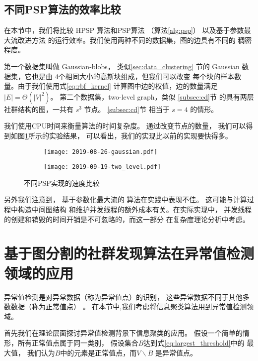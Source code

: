 \subsection{不同PSP算法的效率比较}
在本节中，我们将比较 HPSP 算法和PSP算法
（算法\ref{alg:psp}）
以及基于参数最大流改进方法\cite{kolmogorov}
的运行效率。我们使用两种不同的数据集，图的边具有不同的
稠密程度。

第一个数据集叫做 Gaussian-blobs，
类似\ref{sec:data_clustering}
节的 Gaussian 数据集，它也是由
4个相同大小的高斯块组成，但我们可以改变
每个块的样本数量。由于我们使用式\ref{eq:rbf_kernel}
计算图中边的权值，边的数量满足 $|E|=\Theta(|V|^2)$。
第二个数据集，two-level graph，类似 \ref{subsec:cd}节
的具有两层社群结构的图，一共有 $s^3$ 节点。
\ref{subsec:cd}节 相当于 $s=4$ 的情形。

我们使用CPU时间来衡量算法的时间复杂度。
通过改变节点的数量，
我们可以得到如图\ref{fig:esc}所示的实验结果，
可以看出，我们的实现比以前的实现要快得多。
\begin{figure}
	\centering
	\begin{subfigure}{0.45\textwidth}
		\texttt{[image: 2019-08-26-gaussian.pdf]}
	\end{subfigure}
	\begin{subfigure}{0.45\textwidth}
		\texttt{[image: 2019-09-19-two\_level.pdf]}
	\end{subfigure}
	\caption{
  不同PSP实现的速度比较}\label{fig:esc}
\end{figure}

另外我们注意到，
基于参数化最大流的
算法\citep{kolmogorov}在实践中表现不佳。
这可能与计算过程中构造中间图结构
和维护并发线程的额外成本有关。在实际实现中，
并发线程的创建和销毁的时间开销是不可忽略的，而这一部分
在复杂度理论分析中考虑。

\section{基于图分割的社群发现算法在异常值检测领域的应用}
异常值检测是对异常数据（称为异常值点）的识别，
这些异常数据不同于其他多数数据（称为正常值点）
\citep{grubbs1969procedures}。
在本节中,我们考虑将信息聚类算法用到异常值检测领域。

首先我们在理论层面探讨异常值检测背景下信息聚类的应用。
假设一个简单的情形，所有正常值点属于同一类别，
假设集合$B$达到式\eqref{eq:largest_threshold}中的
最大值，
我们认为$B$中的元素是正常值点，而$V\backslash B$ 是异常值点。

